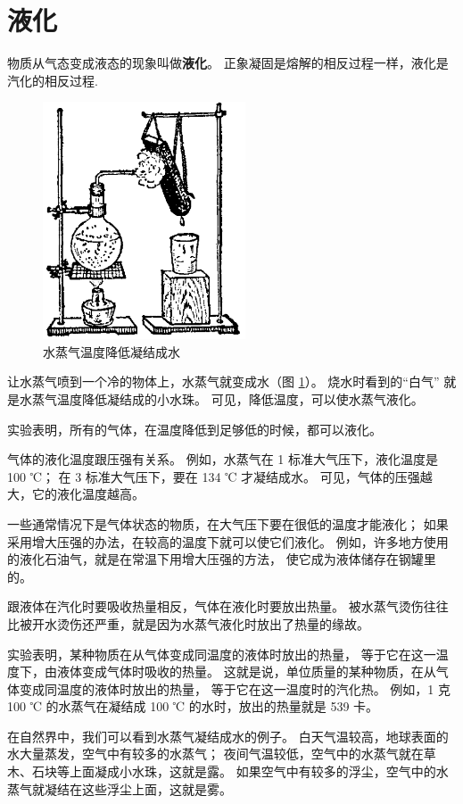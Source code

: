\section{液化}\label{sec:4-4}

物质从气态变成液态的现象叫做\textbf{液化}。
正象凝固是熔解的相反过程一样，液化是汽化的相反过程.

\begin{figure}
    \centering
    \includegraphics[width=6cm]{../pic/czwl2-ch4-8}
    \caption{水蒸气温度降低凝结成水}\label{fig:4-8}
\end{figure}


让水蒸气喷到一个冷的物体上，水蒸气就变成水（图 \ref{fig:4-8}）。
烧水时看到的“白气” 就是水蒸气温度降低凝结成的小水珠。
可见，降低温度，可以使水蒸气液化。

实验表明，所有的气体，在温度降低到足够低的时候，都可以液化。

气体的液化温度跟压强有关系。
例如，水蒸气在 1 标准大气压下，液化温度是 100 ℃；
在 3 标准大气压下，要在 134 ℃ 才凝结成水。
可见，气体的压强越大，它的液化温度越高。

一些通常情况下是气体状态的物质，在大气压下要在很低的温度才能液化；
如果采用增大压强的办法，在较高的温度下就可以使它们液化。
例如，许多地方使用的液化石油气，就是在常温下用增大压强的方法，
使它成为液体储存在钢罐里的。

跟液体在汽化时要吸收热量相反，气体在液化时要放出热量。
被水蒸气烫伤往往比被开水烫伤还严重，就是因为水蒸气液化时放出了热量的缘故。

实验表明，某种物质在从气体变成同温度的液体时放出的热量，
等于它在这一温度下，由液体变成气体时吸收的热量。
这就是说，单位质量的某种物质，在从气体变成同温度的液体时放出的热量，
等于它在这一温度时的汽化热。
例如，1 克 100 ℃ 的水蒸气在凝结成 100 ℃ 的水时，放出的热量就是 539 卡。

在自然界中，我们可以看到水蒸气凝结成水的例子。
白天气温较高，地球表面的水大量蒸发，空气中有较多的水蒸气；
夜间气温较低，空气中的水蒸气就在草木、石块等上面凝成小水珠，这就是露。
如果空气中有较多的浮尘，空气中的水蒸气就凝结在这些浮尘上面，这就是雾。


